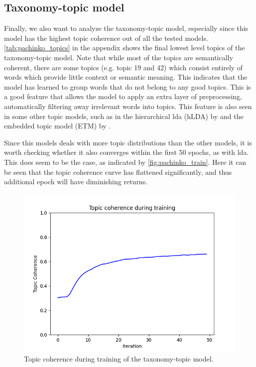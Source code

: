 \subsection{Taxonomy-topic model}\label{sec:taxonomy_analysis}
Finally, we also want to analyze the taxonomy-topic model, especially since this model has the highest topic coherence out of all the tested models.
\autoref{tab:pachinko_topics} in the appendix shows the final lowest level topics of the taxonomy-topic model.
Note that while most of the topics are semantically coherent, there are some topics (e.g. topic 19 and 42) which consist entirely of words which provide little context or semantic meaning.
This indicates that the model has learned to group words that do not belong to any good topics.
This is a good feature that allows the model to apply an extra layer of preprocessing, automatically filtering away irrelevant words into topics.
This feature is also seen in some other topic models, such as in the hierarchical \gls{lda} (hLDA) by \citet{hLDA2004} and the embedded topic model (ETM) by \citet{dieng2020topic}.

Since this models deals with more topic distributions than the other models, it is worth checking whether it also converges within the first 50 epochs, as with \gls{lda}.
This does seem to be the case, as indicated by \autoref{fig:pachinko_train}.
Here it can be seen that the topic coherence curve has flattened significantly, and thus additional epoch will have diminishing returns.

\begin{figure}
	\centering
	\includegraphics[width= \linewidth]{figures/pachinko_training.PNG}
	\caption{Topic coherence during training of the taxonomy-topic model.}
	\label{fig:pachinko_train}
\end{figure}

